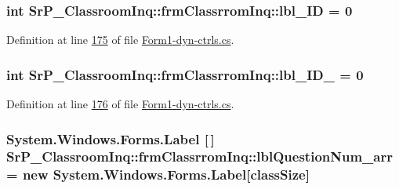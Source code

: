 \hypertarget{class_sr_p___classroom_inq_1_1frm_classrrom_inq_a15d44adc56e5e6523bfadd27d9966935}{
\subsubsection[{lbl\-\_\-\-I\-D}]{\setlength{\rightskip}{0pt plus 5cm}int {\bf \-Sr\-P\-\_\-\-Classroom\-Inq\-::frm\-Classrrom\-Inq\-::lbl\-\_\-\-I\-D} = 0}}
\label{class_sr_p___classroom_inq_1_1frm_classrrom_inq_a15d44adc56e5e6523bfadd27d9966935}


\-Definition at line \hyperlink{_form1-dyn-ctrls_8cs_source_l00175}{175} of file \hyperlink{_form1-dyn-ctrls_8cs_source}{\-Form1-\/dyn-\/ctrls.\-cs}.

\hypertarget{class_sr_p___classroom_inq_1_1frm_classrrom_inq_a5d14fbec9e02ebe6942d26ae8ed53d3b}{
\subsubsection[{lbl\-\_\-\-I\-D\-\_\-2}]{\setlength{\rightskip}{0pt plus 5cm}int {\bf \-Sr\-P\-\_\-\-Classroom\-Inq\-::frm\-Classrrom\-Inq\-::lbl\-\_\-\-I\-D\-\_} = 0}}
\label{class_sr_p___classroom_inq_1_1frm_classrrom_inq_a5d14fbec9e02ebe6942d26ae8ed53d3b}


\-Definition at line \hyperlink{_form1-dyn-ctrls_8cs_source_l00176}{176} of file \hyperlink{_form1-dyn-ctrls_8cs_source}{\-Form1-\/dyn-\/ctrls.\-cs}.

\hypertarget{class_sr_p___classroom_inq_1_1frm_classrrom_inq_ae46e928c386c686caa96bfe4f302c2f1}{
\subsubsection[{lbl\-Question\-Num\-\_\-arr}]{\setlength{\rightskip}{0pt plus 5cm}\-System.\-Windows.\-Forms.\-Label \mbox{[}$\,$\mbox{]} {\bf \-Sr\-P\-\_\-\-Classroom\-Inq\-::frm\-Classrrom\-Inq\-::lbl\-Question\-Num\-\_\-arr} = new \-System.\-Windows.\-Forms.\-Label\mbox{[}{\bf class\-Size}\mbox{]}}}
\label{class_sr_p___classroom_inq_1_1frm_classrrom_inq_ae46e928c386c686caa96bfe4f302c2f1}


